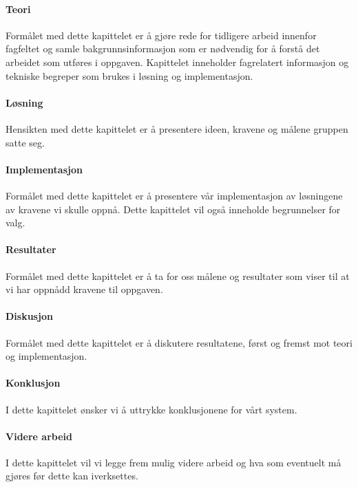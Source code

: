 \paragraph{Teori} Formålet med dette kapittelet er å gjøre rede for tidligere arbeid innenfor fagfeltet og samle bakgrunnsinformasjon som er nødvendig for å forstå det arbeidet som utføres i oppgaven. Kapittelet inneholder fagrelatert informasjon og tekniske begreper som brukes i løsning og implementasjon.

\paragraph{Løsning} Hensikten med dette kapittelet er å presentere ideen, krav\-ene og målene gruppen satte seg. 

\paragraph{Implementasjon} Formålet med dette kapittelet er å presentere vår implementasjon av løsningene av kravene vi skulle oppnå. Dette kapittelet vil også inneholde begrunnelser for valg.

\paragraph{Resultater} Formålet med dette kapittelet er å ta for oss målene og resultater som viser til at vi har oppnådd kravene til oppgaven.

\paragraph{Diskusjon} Formålet med dette kapittelet er å diskutere resultat\-ene, først og fremst mot teori og implementasjon.

\paragraph{Konklusjon} I dette kapittelet ønsker vi å uttrykke konklusjonene for vårt system.

\paragraph{Videre arbeid} I dette kapittelet vil vi legge frem mulig videre arbeid og hva som eventuelt må gjøres før dette kan iverksettes.